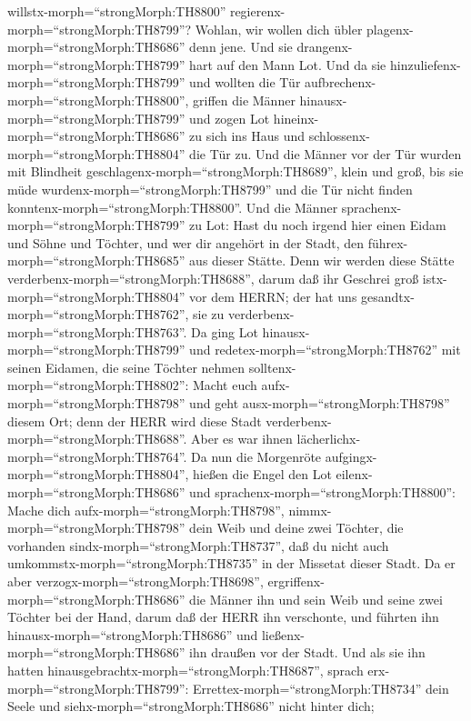 willstx-morph=``strongMorph:TH8800''
regierenx-morph=``strongMorph:TH8799''? Wohlan, wir wollen dich übler
plagenx-morph=``strongMorph:TH8686'' denn jene. Und sie
drangenx-morph=``strongMorph:TH8799'' hart auf den Mann Lot. Und da sie
hinzuliefenx-morph=``strongMorph:TH8799'' und wollten die Tür
aufbrechenx-morph=``strongMorph:TH8800'',  griffen die
Männer hinausx-morph=``strongMorph:TH8799'' und zogen Lot
hineinx-morph=``strongMorph:TH8686'' zu sich ins Haus und
schlossenx-morph=``strongMorph:TH8804'' die Tür zu.  Und
die Männer vor der Tür wurden mit Blindheit
geschlagenx-morph=``strongMorph:TH8689'', klein und groß, bis sie müde
wurdenx-morph=``strongMorph:TH8799'' und die Tür nicht finden
konntenx-morph=``strongMorph:TH8800''.  Und die Männer
sprachenx-morph=``strongMorph:TH8799'' zu Lot: Hast du noch irgend hier
einen Eidam und Söhne und Töchter, und wer dir angehört in der Stadt,
den führex-morph=``strongMorph:TH8685'' aus dieser Stätte. 
Denn wir werden diese Stätte verderbenx-morph=``strongMorph:TH8688'',
darum daß ihr Geschrei groß istx-morph=``strongMorph:TH8804'' vor dem
HERRN; der hat uns gesandtx-morph=``strongMorph:TH8762'', sie zu
verderbenx-morph=``strongMorph:TH8763''.  Da ging Lot
hinausx-morph=``strongMorph:TH8799'' und
redetex-morph=``strongMorph:TH8762'' mit seinen Eidamen, die seine
Töchter nehmen solltenx-morph=``strongMorph:TH8802'': Macht euch
aufx-morph=``strongMorph:TH8798'' und geht
ausx-morph=``strongMorph:TH8798'' diesem Ort; denn der HERR wird diese
Stadt verderbenx-morph=``strongMorph:TH8688''. Aber es war ihnen
lächerlichx-morph=``strongMorph:TH8764''.  Da nun die
Morgenröte aufgingx-morph=``strongMorph:TH8804'', hießen die Engel den
Lot eilenx-morph=``strongMorph:TH8686'' und
sprachenx-morph=``strongMorph:TH8800'': Mache dich
aufx-morph=``strongMorph:TH8798'', nimmx-morph=``strongMorph:TH8798''
dein Weib und deine zwei Töchter, die vorhanden
sindx-morph=``strongMorph:TH8737'', daß du nicht auch
umkommstx-morph=``strongMorph:TH8735'' in der Missetat dieser Stadt.
 Da er aber verzogx-morph=``strongMorph:TH8698'',
ergriffenx-morph=``strongMorph:TH8686'' die Männer ihn und sein Weib und
seine zwei Töchter bei der Hand, darum daß der HERR ihn verschonte, und
führten ihn hinausx-morph=``strongMorph:TH8686'' und
ließenx-morph=``strongMorph:TH8686'' ihn draußen vor der Stadt.
 Und als sie ihn hatten
hinausgebrachtx-morph=``strongMorph:TH8687'', sprach
erx-morph=``strongMorph:TH8799'': Errettex-morph=``strongMorph:TH8734''
dein Seele und siehx-morph=``strongMorph:TH8686'' nicht hinter dich;
